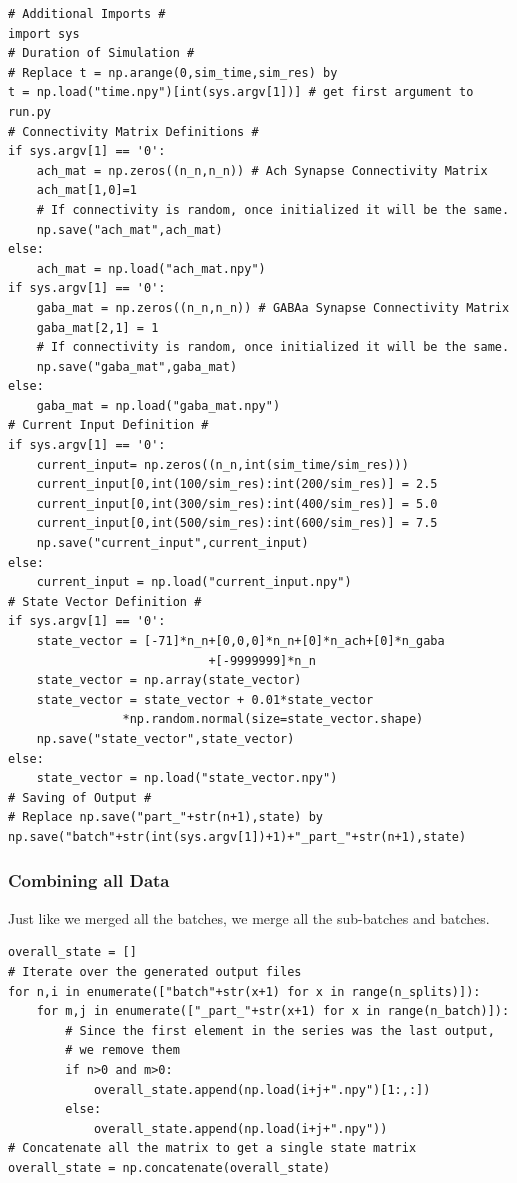 \documentclass[10pt,letterpaper]{article}
\begin{document}
\begin{verbatim}
# Additional Imports #
import sys
# Duration of Simulation #
# Replace t = np.arange(0,sim_time,sim_res) by
t = np.load("time.npy")[int(sys.argv[1])] # get first argument to run.py
# Connectivity Matrix Definitions #
if sys.argv[1] == '0':
    ach_mat = np.zeros((n_n,n_n)) # Ach Synapse Connectivity Matrix
    ach_mat[1,0]=1
    # If connectivity is random, once initialized it will be the same.
    np.save("ach_mat",ach_mat)
else:
    ach_mat = np.load("ach_mat.npy")
if sys.argv[1] == '0':
    gaba_mat = np.zeros((n_n,n_n)) # GABAa Synapse Connectivity Matrix
    gaba_mat[2,1] = 1
    # If connectivity is random, once initialized it will be the same.
    np.save("gaba_mat",gaba_mat)
else:
    gaba_mat = np.load("gaba_mat.npy")
# Current Input Definition #
if sys.argv[1] == '0':
    current_input= np.zeros((n_n,int(sim_time/sim_res)))
    current_input[0,int(100/sim_res):int(200/sim_res)] = 2.5
    current_input[0,int(300/sim_res):int(400/sim_res)] = 5.0
    current_input[0,int(500/sim_res):int(600/sim_res)] = 7.5
    np.save("current_input",current_input)
else:
    current_input = np.load("current_input.npy")
# State Vector Definition #
if sys.argv[1] == '0':
    state_vector = [-71]*n_n+[0,0,0]*n_n+[0]*n_ach+[0]*n_gaba
    						+[-9999999]*n_n
    state_vector = np.array(state_vector)
    state_vector = state_vector + 0.01*state_vector
    			*np.random.normal(size=state_vector.shape)
    np.save("state_vector",state_vector)
else:
    state_vector = np.load("state_vector.npy")
# Saving of Output #
# Replace np.save("part_"+str(n+1),state) by
np.save("batch"+str(int(sys.argv[1])+1)+"_part_"+str(n+1),state)
\end{verbatim}

\subsubsection*{Combining all Data}
Just like we merged all the batches, we merge all the sub-batches and batches.

\begin{verbatim}
overall_state = []
# Iterate over the generated output files
for n,i in enumerate(["batch"+str(x+1) for x in range(n_splits)]):
    for m,j in enumerate(["_part_"+str(x+1) for x in range(n_batch)]):
        # Since the first element in the series was the last output, 
        # we remove them
        if n>0 and m>0:
            overall_state.append(np.load(i+j+".npy")[1:,:])
        else:
            overall_state.append(np.load(i+j+".npy"))
# Concatenate all the matrix to get a single state matrix
overall_state = np.concatenate(overall_state)
\end{verbatim}
\end{document}

